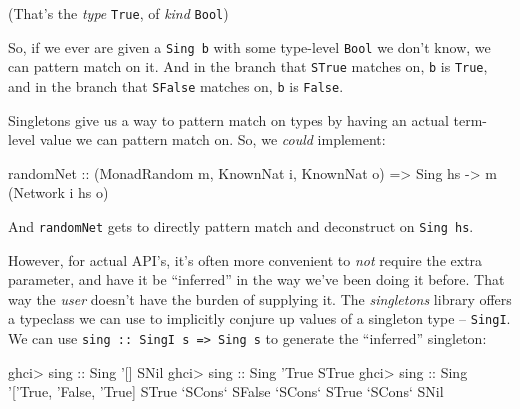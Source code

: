 \documentclass[]{article}
\newenvironment{Shaded}{}{}
\newcommand{\DataTypeTok}[1]{\textcolor[rgb]{0.56,0.13,0.00}{{#1}}}
\newcommand{\CharTok}[1]{\textcolor[rgb]{0.25,0.44,0.63}{{#1}}}
\newcommand{\OtherTok}[1]{\textcolor[rgb]{0.00,0.44,0.13}{{#1}}}
\newcommand{\FunctionTok}[1]{\textcolor[rgb]{0.02,0.16,0.49}{{#1}}}
\newcommand{\NormalTok}[1]{{#1}}
\begin{document}
(That's the \emph{type} \texttt{\textquotesingle{}True}, of \emph{kind}
\texttt{Bool})

So, if we ever are given a \texttt{Sing\ b} with some type-level \texttt{Bool}
we don't know, we can pattern match on it. And in the branch that \texttt{STrue}
matches on, \texttt{b} is \texttt{\textquotesingle{}True}, and in the branch
that \texttt{SFalse} matches on, \texttt{b} is \texttt{False}.

Singletons give us a way to pattern match on types by having an actual
term-level value we can pattern match on. So, we \emph{could} implement:

\begin{Shaded}
\begin{Highlighting}[]
\OtherTok{randomNet ::} \NormalTok{(}\DataTypeTok{MonadRandom} \NormalTok{m, }\DataTypeTok{KnownNat} \NormalTok{i, }\DataTypeTok{KnownNat} \NormalTok{o)}
          \OtherTok{=>} \DataTypeTok{Sing} \NormalTok{hs }\OtherTok{->} \NormalTok{m (}\DataTypeTok{Network} \NormalTok{i hs o)}
\end{Highlighting}
\end{Shaded}

And \texttt{randomNet} gets to directly pattern match and deconstruct on
\texttt{Sing\ hs}.

However, for actual API's, it's often more convenient to \emph{not} require the
extra parameter, and have it be ``inferred'' in the way we've been doing it
before. That way the \emph{user} doesn't have the burden of supplying it. The
\emph{singletons} library offers a typeclass we can use to implicitly conjure up
values of a singleton type -- \texttt{SingI}. We can use
\texttt{sing\ ::\ SingI\ s\ =\textgreater{}\ Sing\ s} to generate the
``inferred'' singleton:

\begin{Shaded}
\begin{Highlighting}[]
\NormalTok{ghci}\FunctionTok{>}\OtherTok{ sing ::} \DataTypeTok{Sing} \CharTok{'[]}
\DataTypeTok{SNil}
\NormalTok{ghci}\FunctionTok{>}\OtherTok{ sing ::} \DataTypeTok{Sing} \CharTok{'True}
\DataTypeTok{STrue}
\NormalTok{ghci}\FunctionTok{>}\OtherTok{ sing ::} \DataTypeTok{Sing} \CharTok{'['}\DataTypeTok{True}\NormalTok{, }\CharTok{'False, '}\DataTypeTok{True}\NormalTok{]}
\DataTypeTok{STrue} \OtherTok{`SCons`} \DataTypeTok{SFalse} \OtherTok{`SCons`} \DataTypeTok{STrue} \OtherTok{`SCons`} \DataTypeTok{SNil}
\end{Highlighting}
\end{Shaded}
\end{document}

